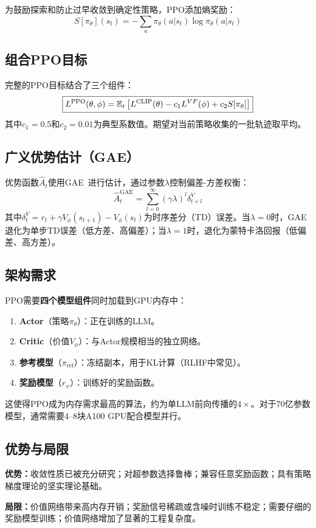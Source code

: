 为鼓励探索和防止过早收敛到确定性策略，PPO添加熵奖励：
\begin{equation}
S[\pi_\theta](s_t) = -\sum_{a} \pi_\theta(a|s_t)\log\pi_\theta(a|s_t)
\end{equation}

\subsection{组合PPO目标}

完整的PPO目标结合了三个组件：
\begin{equation}
\boxed{L^{\text{PPO}}(\theta, \phi) = \mathbb{E}_t\left[L^{\text{CLIP}}(\theta) - c_1 L^{VF}(\phi) + c_2 S[\pi_\theta]\right]}
\label{eq:ppo}
\end{equation}
其中$c_1 = 0.5$和$c_2 = 0.01$为典型系数值。期望对当前策略收集的一批轨迹取平均。

\subsection{广义优势估计（GAE）}

优势函数$\hat{A}_t$使用GAE~\cite{schulman2016gae}进行估计，通过参数$\lambda$控制偏差-方差权衡：
\begin{equation}
\hat{A}_t^{\text{GAE}} = \sum_{l=0}^{\infty}(\gamma\lambda)^l\delta_{t+l}^{V}
\end{equation}
其中$\delta_t^{V} = r_t + \gamma V_\phi(s_{t+1}) - V_\phi(s_t)$为时序差分（TD）误差。当$\lambda = 0$时，GAE退化为单步TD误差（低方差、高偏差）；当$\lambda = 1$时，退化为蒙特卡洛回报（低偏差、高方差）。

\subsection{架构需求}

PPO需要\textbf{四个模型组件}同时加载到GPU内存中：
\begin{enumerate}[leftmargin=*, itemsep=1pt]
\item \textbf{Actor}（策略$\pi_\theta$）：正在训练的LLM。
\item \textbf{Critic}（价值$V_\phi$）：与Actor规模相当的独立网络。
\item \textbf{参考模型}（$\pi_{\text{ref}}$）：冻结副本，用于KL计算（RLHF中常见）。
\item \textbf{奖励模型}（$r_\psi$）：训练好的奖励函数。
\end{enumerate}

这使得PPO成为内存需求最高的算法，约为单LLM前向传播的$4\times$。对于70亿参数模型，通常需要4--8块A100 GPU配合模型并行。

\subsection{优势与局限}

\textbf{优势：}收敛性质已被充分研究；对超参数选择鲁棒；兼容任意奖励函数；具有策略梯度理论的坚实理论基础。

\textbf{局限：}价值网络带来高内存开销；奖励信号稀疏或含噪时训练不稳定；需要仔细的奖励模型训练；价值网络增加了显著的工程复杂度。
